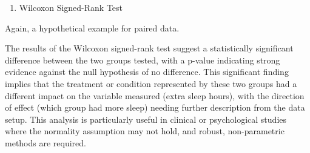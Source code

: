 \documentclass[
]{book}
\newenvironment{Shaded}{\begin{snugshade}}{\end{snugshade}}
\newcommand{\AttributeTok}[1]{\textcolor[rgb]{0.13,0.29,0.53}{#1}}
\newcommand{\CommentTok}[1]{\textcolor[rgb]{0.56,0.35,0.01}{\textit{#1}}}
\newcommand{\ConstantTok}[1]{\textcolor[rgb]{0.56,0.35,0.01}{#1}}
\newcommand{\DecValTok}[1]{\textcolor[rgb]{0.00,0.00,0.81}{#1}}
\newcommand{\FunctionTok}[1]{\textcolor[rgb]{0.13,0.29,0.53}{\textbf{#1}}}
\newcommand{\NormalTok}[1]{#1}
\newcommand{\OtherTok}[1]{\textcolor[rgb]{0.56,0.35,0.01}{#1}}
\newcommand{\SpecialCharTok}[1]{\textcolor[rgb]{0.81,0.36,0.00}{\textbf{#1}}}
\providecommand{\tightlist}{%
  \setlength{\itemsep}{0pt}\setlength{\parskip}{0pt}}
\begin{document}
\begin{enumerate}
\def\labelenumi{\alph{enumi}.}
\setcounter{enumi}{1}
\tightlist
\item
  Wilcoxon Signed-Rank Test
\end{enumerate}

Again, a hypothetical example for paired data.

\begin{Shaded}
\end{Shaded}

The results of the Wilcoxon signed-rank test suggest a statistically significant difference between the two groups tested, with a p-value indicating strong evidence against the null hypothesis of no difference. This significant finding implies that the treatment or condition represented by these two groups had a different impact on the variable measured (extra sleep hours), with the direction of effect (which group had more sleep) needing further description from the data setup. This analysis is particularly useful in clinical or psychological studies where the normality assumption may not hold, and robust, non-parametric methods are required.
\end{document}
